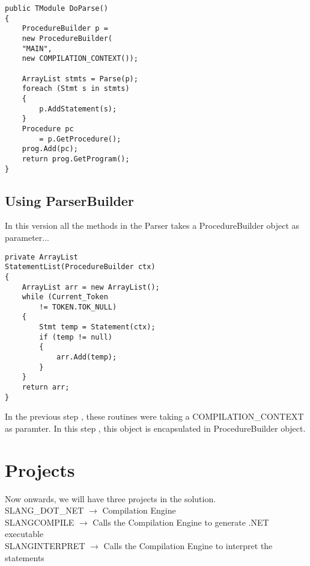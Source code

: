 \lstset{style=csharp}
\begin{lstlisting}
public TModule DoParse()
{
	ProcedureBuilder p = 
	new ProcedureBuilder(
	"MAIN", 
	new COMPILATION_CONTEXT());
	
	ArrayList stmts = Parse(p);
	foreach (Stmt s in stmts)
	{
		p.AddStatement(s);
	}
	Procedure pc 
		= p.GetProcedure();
	prog.Add(pc);
	return prog.GetProgram();
}
\end{lstlisting}
\subsection{Using ParserBuilder}
In this version all the methods in the Parser takes a ProcedureBuilder object as parameter...
\lstset{style=csharp}
\begin{lstlisting}
private ArrayList 
StatementList(ProcedureBuilder ctx)
{
	ArrayList arr = new ArrayList();
	while (Current_Token 
		!= TOKEN.TOK_NULL)
	{
		Stmt temp = Statement(ctx);
		if (temp != null)
		{
			arr.Add(temp);
		}
	}
	return arr;
}
\end{lstlisting}
In the previous step , these routines were taking a COMPILATION\_CONTEXT as paramter. In this step , this object is encapsulated in ProcedureBuilder object.

\section{Projects}
Now onwards, we will have three projects in the solution.\\
SLANG\_DOT\_NET $\rightarrow$ Compilation Engine\\
SLANGCOMPILE $\rightarrow$ Calls the Compilation Engine to generate .NET executable\\
SLANGINTERPRET $\rightarrow$ Calls the Compilation Engine to interpret the statements\\
